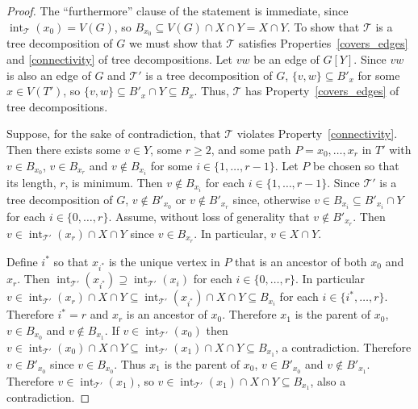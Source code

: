 \documentclass{patmorin}
\DeclareMathOperator{\interior}{int}
\begin{document}
\begin{proof}
  The ``furthermore'' clause of the statement is immediate, since $\interior_{\mathcal{T}}(x_0)=V(G)$, so $B_{x_0}\subseteq V(G)\cap X\cap Y=X\cap Y$.
  To show that $\mathcal{T}$ is a tree decomposition of $G$ we must show that $\mathcal{T}$ satisfies Properties~\ref{covers_edges} and \ref{connectivity} of tree decompositions.
  Let $vw$ be an edge of $G[Y]$.  Since $vw$ is also an edge of $G$ and  $\mathcal{T'}$ is a tree decomposition of $G$,  $\{v,w\}\subseteq B'_x$ for some $x\in V(T')$, so $\{v,w\}\subseteq B'_x\cap Y\subseteq  B_x$. Thus, $\mathcal{T}$ has Property~\ref{covers_edges} of tree decompositions.

  Suppose, for the sake of contradiction, that $\mathcal{T}$ violates Property~\ref{connectivity}.  Then there exists some $v\in Y$, some $r\ge 2$, and some path $P=x_0,\ldots,x_r$ in $T'$ with $v\in B_{x_0}$, $v\in B_{x_r}$ and $v\not\in B_{x_i}$ for some $i\in\{1,\ldots,r-1\}$.  Let $P$ be chosen so that its length, $r$, is minimum.  Then $v\not\in B_{x_i}$ for each $i\in\{1,\ldots,r-1\}$.  Since $\mathcal{T}'$ is a tree decomposition of $G$, $v\not\in B'_{x_0}$ or $v\not\in B'_{x_r}$ since, otherwise $v\in B_{x_i}\subseteq B'_{x_i}\cap Y$ for each $i\in\{0,\ldots,r\}$.  Assume, without loss of generality that $v\not\in B'_{x_r}$. Then $v\in\interior_{\mathcal{T}'}(x_r)\cap X\cap Y$ since $v\in B_{x_r}$.  In particular, $v\in X\cap Y$.

  Define $i^*$ so that $x_{i^*}$ is the unique vertex in $P$ that is an ancestor of both $x_0$ and $x_r$.  Then  $\interior_{\mathcal{T}'}(x_{i^*})\supseteq \interior_{\mathcal{T}'}(x_i)$ for each $i\in\{0,\ldots,r\}$.   In particular $v\in \interior_{\mathcal{T}'}(x_r)\cap X\cap Y\subseteq\interior_{\mathcal{T}'}(x_{i^*})\cap X\cap Y\subseteq B_{x_{i}}$ for each $i\in\{i^*,\ldots,r\}$.  Therefore $i^*=r$ and $x_r$ is an ancestor of $x_0$.  Therefore $x_1$ is the parent of $x_0$, $v\in B_{x_0}$ and $v\not\in B_{x_1}$.  If $v\in\interior_{\mathcal{T}'}(x_0)$ then $v\in\interior_{\mathcal{T}'}(x_0)\cap X\cap Y\subseteq\interior_{\mathcal{T}'}(x_1)\cap X\cap Y\subseteq B_{x_1}$, a contradiction.  Therefore $v\in B'_{x_0}$ since $v\in B_{x_0}$.  Thus $x_1$ is the parent of $x_0$, $v\in B'_{x_0}$ and $v\not\in B'_{x_1}$.  Therefore $v\in\interior_{\mathcal{T}'}(x_1)$, so $v\in\interior_{\mathcal{T}'}(x_1)\cap X\cap Y\subseteq B_{x_1}$, also a contradiction.
\end{proof}
\end{document}
